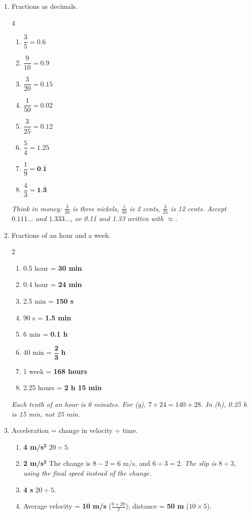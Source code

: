 \documentclass[12pt, twoside]{article}
\begin{document}
\begin{enumerate}[itemsep=0.3cm]
\item Fractions as decimals.
  \begin{multicols}{4}
    \begin{enumerate}[itemsep=0.15cm]
      \item $\dfrac{3}{5} = \mathbf{0.6}$
      \item $\dfrac{9}{10} = \mathbf{0.9}$
      \item $\dfrac{3}{20} = \mathbf{0.15}$
      \item $\dfrac{1}{50} = \mathbf{0.02}$
      \item $\dfrac{3}{25} = \mathbf{0.12}$
      \item $\dfrac{5}{4} = \mathbf{1.25}$
      \item $\dfrac{1}{9} = \mathbf{0.\overline{1}}$
      \item $\dfrac{4}{3} = \mathbf{1.\overline{3}}$
    \end{enumerate}
  \end{multicols}
  \emph{Think in money: $\frac{3}{20}$ is three nickels, $\frac{1}{50}$ is 2 cents,
  $\frac{3}{25}$ is 12 cents. Accept $0.111\ldots$ and $1.333\ldots$, or 0.11 and
  1.33 written with $\approx$.}

\item Fractions of an hour and a week.
  \begin{multicols}{2}
    \begin{enumerate}[itemsep=0.1cm]
      \item 0.5 hour = \textbf{30 min}
      \item 0.4 hour = \textbf{24 min}
      \item 2.5 min = \textbf{150 s}
      \item 90 s = \textbf{1.5 min}
      \item 6 min = \textbf{0.1 h}
      \item 40 min = $\mathbf{\dfrac{2}{3}}$ \textbf{h}
      \item 1 week = \textbf{168 hours}
      \item 2.25 hours = \textbf{2 h 15 min}
    \end{enumerate}
  \end{multicols}
  \emph{Each tenth of an hour is 6 minutes. For (g), $7 \times 24 = 140 + 28$. In (h),
  0.25 h is 15 min, not 25 min.}

\item Acceleration = change in velocity $\div$ time.
  \begin{enumerate}[itemsep=0.1cm]
    \item \textbf{4 m/s$^\mathbf{2}$} \quad $20 \div 5$.
    \item \textbf{2 m/s$^\mathbf{2}$} \quad The change is $8 - 2 = 6$ m/s, and
      $6 \div 3 = 2$. \emph{The slip is $8 \div 3$, using the final speed instead of
      the change.}
    \item \textbf{4 s} \quad $20 \div 5$.
    \item Average velocity = \textbf{10 m/s} \quad ($\frac{0 + 20}{2}$); \quad
      distance = \textbf{50 m} \quad ($10 \times 5$).
  \end{enumerate}


\end{enumerate}
\end{document}
